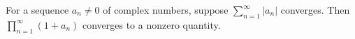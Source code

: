 \documentclass{homework}
\begin{document}
                                                                                                                                \begin{problem}\label{nonzero-infinite-product}
                                                                                                                                For a sequence $a_n \neq 0$ of complex numbers, suppose
                                                                                                                                  $\displaystyle\sum_{n=1}^\infty |a_n|$ converges.  Then
                                                                                                                                    $\displaystyle\prod_{n=1}^\infty \left( 1 + a_n \right)$ converges
                                                                                                                                      to a nonzero quantity.
                                                                                                                                      \end{problem}
\end{document}
